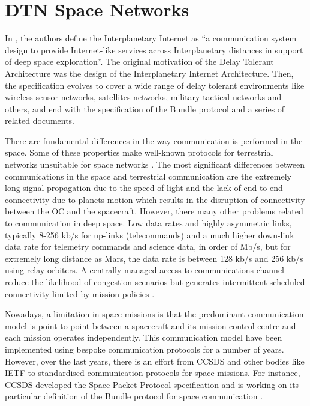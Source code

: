 \section{DTN Space Networks}


In \cite{cerf2007delay}, the authors define the Interplanetary Internet as ``a communication system design to provide Internet-like services across Interplanetary distances in support of deep space exploration''. The original motivation of the Delay Tolerant Architecture was the design of the Interplanetary Internet Architecture. Then, the specification evolves to cover a wide range of delay tolerant environments like wireless sensor networks, satellites networks, military tactical networks and others, and end with the specification of the Bundle protocol \cite{scott2007bundle} and a series of related documents.  

There are fundamental differences in the way communication is performed in the space. Some of these properties make well-known protocols for terrestrial networks unsuitable for space networks \cite{fall2003delay}. The most significant differences between communications in the space and terrestrial communication are the extremely long signal propagation due to the speed of light and the lack of end-to-end connectivity due to planets motion which results in the disruption of connectivity between the OC and the spacecraft. However, there many other problems related to communication in deep space. Low data rates and highly asymmetric links, typically 8-256 kb/s for up-links (telecommands) and a much higher down-link data rate for telemetry commands and science data, in order of Mb/s, but for extremely long distance as Mars, the data rate is between 128 kb/s and 256 kb/s using relay orbiters. A centrally managed access to communications channel reduce the likelihood of congestion scenarios but generates intermittent scheduled connectivity limited by mission policies \cite{burleigh2003delay}.

Nowadays, a limitation in space missions is that the predominant communication model is point-to-point between a spacecraft and its mission control centre and each mission operates independently. This communication model have been implemented using bespoke communication protocols for a number of years. However, over the last years, there is an effort from CCSDS and other bodies like IETF to standardised communication protocols for space missions. For instance, CCSDS developed the Space Packet Protocol specification and is working on its particular definition of the Bundle protocol for space communication \cite{standard2010ccsds}. 

